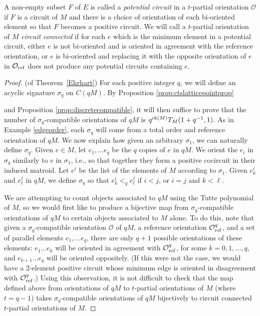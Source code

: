 \documentclass[12pt]{amsart}
\numberwithin{equation}{section}
\theoremstyle{definition}
\begin{document}
A non-empty subset $F$ of $E$ is called a {\em potential circuit} in a $t$-partial orientation $\mathcal{O}$ if $F$ is a circuit of $M$ and there is a choice of orientation of each bi-oriented element so that $F$ becomes a positive circuit.  We will call a $t$-partial orientation of $M$ {\em circuit connected} if for each $e$ which is the minimum element in a potential circuit, either $e$ is not bi-oriented and is oriented in agreement with the reference orientation, or $e$ is bi-oriented and replacing it with the opposite orientation of $e$ in $\mathcal{O}_{\rm ref}$ does not produce any potential circuits containing $e$.

\begin{proof}
(of Theorem~\ref{Ehrhart})
For each positive integer $q$,
we will define an acyclic signature $\sigma_q$ on $C(qM)$. By Proposition \ref{prop:ctslatticepointprop}
 
and Proposition \ref{prop:discretecompatible}, it will then suffice to prove that the number of $\sigma_q$-compatible orientations of $qM$ is $q^{{\rm rk}(M)} T_{M}(1 + q^{-1},1)$.  As in Example \ref{edgeorder}, each $\sigma_q$ will come from a total order and reference orientation of $qM$. We now explain how given an arbitrary $\sigma_1$, we can naturally define $\sigma_q$.  Given $e \in M$, let $e_1, \dots e_q$ be the $q$ copies of $e$ in $q M$.  We orient the $e_i$ in $\sigma_q$ similarly to $e$ in $\sigma_1$, i.e., so that together they form a positive cocircuit in their induced matroid.  Let $e^i$ be the list of the elements of $M$ according to $\sigma_1$.  Given $e^i_k$ and $e^j_\ell$ in $qM$, we define $\sigma_q$ so that $e^i_k <_q e^j_\ell$ if $i<j$, or $i=j$ and $k<\ell$.

We are attempting to count objects associated to $qM$ using the Tutte polynomial of $M$, so we would first like to produce a bijective map from $\sigma_q$-compatible orientations of $qM$ to certain objects associated to $M$ alone.  To do this, note that given a $\sigma_q$-compatible orientation $\mathcal{O}$ of $qM$, a reference orientation $\mathcal{O}^q_{\rm ref}$, and a set of parallel elements $e_1, \dots e_q$, there are only $q+1$ possible orientations of these elements: $e_1 \dots e_k$ will be oriented in agreement with $\mathcal{O}^q_{\rm ref}$, for some $k=0,1,\ldots,q$, and $e_{k+1} \dots e_q$ will be oriented oppositely.  (If this were not the case, we would have a 2-element positive circuit whose minimum edge is oriented in disagreement with $\mathcal{O}^q_{\rm ref}$.)
Using this observation, it is not difficult to check that the map defined above from orientations of $qM$ to $t$-partial orientations of $M$ (where $t=q-1$) takes $\sigma_q$-compatible orientations of $qM$ bijectively to circuit connected $t$-partial orientations of $M$.


\end{proof}
\end{document}

